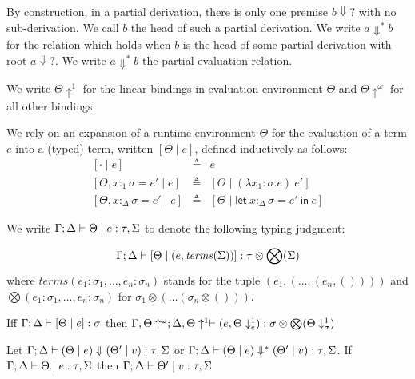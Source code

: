 \documentclass[acmsmall,review,anonymous,screen]{acmart}
\newcommand{\llet}[2]{\mathsf{let}~#1~\mathsf{in}~#2}
\begin{document}
 By construction, in a partial derivation, there is only one premise
 $b\Downarrow?$ with no sub-derivation. We call $b$ the head of such a
 partial derivation.
We write $a \Downarrow^* b$ for the relation which holds when $b$ is
the head of some partial derivation with root $a \Downarrow?$.  We
write $a \Downarrow^* b$  the partial evaluation relation.
 
 We write $\Theta {\uparrow^1}$ for the linear bindings in evaluation environment $\Theta$ and $\Theta {\uparrow^\omega}$ for all other bindings.



 
 \begin{definition}
   We rely on an expansion of a runtime environment $\Theta$ for the evaluation of a term $e$ into a (typed) term, written $[\Theta \mid e]$, defined inductively as follows:
   \[
     \begin{array}{lcl}
       \left[ \cdot \mid e \right] & \triangleq & e\\
       \left[ \Theta , x:_1\sigma = e' \mid e \right] & \triangleq  & [\Theta \mid (\lambda x_1:\sigma . e)~e']\\
       \left[\Theta , x:_\Delta \sigma = e' \mid e \right] & \triangleq & [\Theta \mid \llet{x:_\Delta \sigma = e'}{e}]
    \end{array}
   \]
 \end{definition}
 
 \begin{definition}
   We write $\Gamma;\Delta \vdash \Theta \mid e : \tau,\Sigma$ to denote the following typing judgment:

   \[
\Gamma ; \Delta \vdash [ \Theta \mid (e,\mathit{terms}(\Sigma))] : \tau \otimes \bigotimes(\Sigma)
   \]
   where $\mathit{terms}(e_1 : \sigma_1 , \dots , e_n : \sigma_n)$ stands for the tuple $(e_1 ,( \dots , (e_n , ())))$ and
   $\bigotimes(e_1 : \sigma_1 , \dots , e_n : \sigma_n)$ for $\sigma_1 \otimes ( \dots (\sigma_n \otimes ()))$.
 \end{definition}

 \begin{lemma}
   Iff $\Gamma ; \Delta \vdash [ \Theta \mid e] : \sigma$
     then $\Gamma , \Theta\uparrow^{\omega} ; \Delta , \Theta\uparrow^1 \vdash  (e, \Theta\downarrow^1_e) : \sigma \otimes \bigotimes(\Theta\downarrow^1_\sigma)$
   \end{lemma}

\begin{theorem}\label{thm:typepres}
  Let $\Gamma ; \Delta \vdash (\Theta \mid e) \Downarrow (\Theta' \mid v) :
  \tau , \Sigma$ or $\Gamma ; \Delta \vdash (\Theta \mid e) \Downarrow^* (\Theta' \mid v) :
  \tau , \Sigma$.
  If $\Gamma ; \Delta \vdash \Theta \mid e : \tau , \Sigma$ then $\Gamma ; \Delta \vdash \Theta' \mid v : \tau , \Sigma$
  
\end{theorem}
\end{document}
